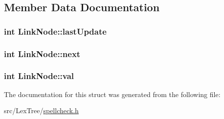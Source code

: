 \subsection{Member Data Documentation}
\hypertarget{struct_link_node_a4ffbf14c9a17c879b071c7495d388072}{
\subsubsection[{last\+Update}]{\setlength{\rightskip}{0pt plus 5cm}int Link\+Node\+::last\+Update}}\label{struct_link_node_a4ffbf14c9a17c879b071c7495d388072}
\hypertarget{struct_link_node_a2fe91b9e48c90391c77ee66bde4997e3}{
\subsubsection[{next}]{\setlength{\rightskip}{0pt plus 5cm}int Link\+Node\+::next}}\label{struct_link_node_a2fe91b9e48c90391c77ee66bde4997e3}
\hypertarget{struct_link_node_a8fd98f74a193df90cfc1ef0cd84b14a8}{
\subsubsection[{val}]{\setlength{\rightskip}{0pt plus 5cm}int Link\+Node\+::val}}\label{struct_link_node_a8fd98f74a193df90cfc1ef0cd84b14a8}


The documentation for this struct was generated from the following file\+:\begin{DoxyCompactItemize}
\item 
src/\+Lex\+Tree/\hyperlink{spellcheck_8h}{spellcheck.\+h}\end{DoxyCompactItemize}
